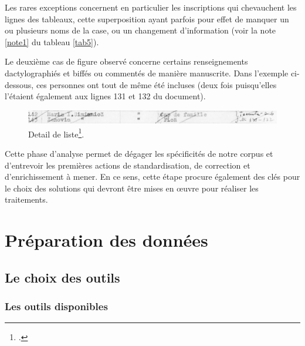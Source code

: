 \documentclass[a4paper,12pt,twoside]{book}
\begin{document}
                Les rares exceptions concernent en particulier les inscriptions qui chevauchent les lignes des tableaux, cette superposition ayant parfois pour effet de manquer un ou plusieurs noms de la case, ou un changement d'information (voir la note \ref{note1} du tableau \ref{tab5}).
                
                Le deuxième cas de figure observé concerne certains renseignements dactylographiés et biffés ou commentés de manière manuscrite. Dans l'exemple ci-dessous, ces personnes ont tout de même été incluses (deux fois puisqu'elles l'étaient également aux lignes 131 et 132 du document).
                
                \begin{figure}[!ht]
        			\centering
                    \includegraphics[width=15cm]{images/rg_25_050m_0009_00000560_detail.jpg}
                    \caption{Detail de liste\footcite[][Copyright \textit{Arhivele Naţionale ale României}]{rg-25.050mfileid:45835SelectedRecordsVarious}.}
                    \label{fig15}
                \end{figure}
                \vspace{-2em}
                
                \pagebreak
                
                Cette phase d'analyse permet de dégager les spécificités de notre corpus et d'entrevoir les premières actions de standardisation, de correction et d'enrichissement à mener. En ce sens, cette étape procure également des clés pour le choix des solutions qui devront être mises en œuvre pour réaliser les traitements. 
                
                
	    \section{Préparation des données}
	    
	        \subsection{Le choix des outils}
	        
	            \subsubsection{Les outils disponibles}
	    
\end{document}
